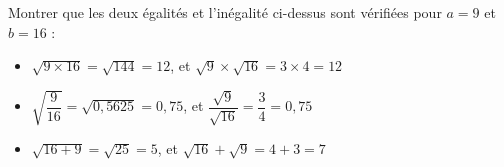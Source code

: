 \documentclass[
	classe=$2^{de}$
]{coursclass}
\begin{document}
\begin{greybox}
	Montrer que les deux égalités et l'inégalité ci-dessus sont vérifiées pour $a = 9$ et $b = 16$ :

	\begin{itemize}
		\item $\sqrt{9×16} = \sqrt{144} = 12$, et $\sqrt{9}×\sqrt{16}=3×4=12$
		\item $\sqrt{\dfrac{9}{16}} = \sqrt{0,5625} = 0,75$, et $\dfrac{\sqrt{9}}{\sqrt{16}} = \dfrac{3}{4} = 0,75$
		\item $\sqrt{16 + 9} = \sqrt{25} = 5$, et $\sqrt{16} + \sqrt{9}=4 + 3=7$
	\end{itemize}
\end{greybox}
\end{document}

